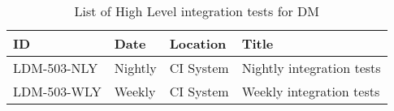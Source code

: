 \begin{longtable} {lllp{}}
\caption{List of High Level integration tests for DM \label{tab:schedule}} \\ %
\toprule
\textbf{ID} & \textbf{Date} & \textbf{Location} & \textbf{Title} \\ \toprule

LDM-503-NLY &
Nightly &
CI System &
Nightly integration tests \\

LDM-503-WLY &
Weekly &
CI System &
Weekly integration tests \\


\bottomrule

\end{longtable}

